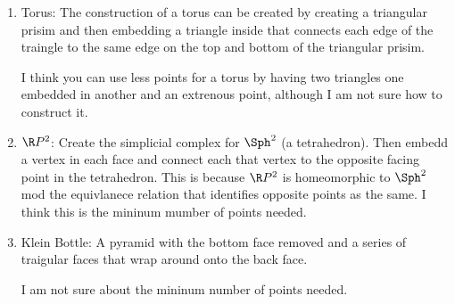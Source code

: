 \documentclass[12pt]{amsart}
\begin{document}
  \newpage
  \begin{problem}
  \begin{enumerate}
    \item Torus: The construction of a torus can be created by creating a triangular prisim and then embedding a triangle inside that connects each edge of the traingle to the same edge on the top and bottom of the triangular prisim.
    
    I think you can use less points for a torus by having two triangles one embedded in another and an extrenous point, although I am not sure how to construct it. 

    \item $\R P^2$: Create the simplicial complex for $\Sph^2$ (a tetrahedron). Then embedd a vertex in each face and connect each that vertex to the opposite facing point in the tetrahedron. This is because $\R P^2$ is homeomorphic to $\Sph^2$ mod the equivlanece relation that identifies opposite points as the same. I think this is the mininum mumber of points needed. 

    \item Klein Bottle: A pyramid  with the bottom face removed and a series of traigular faces that wrap around onto the back face. 

      I am not sure about the mininum number of points needed. 
  \end{enumerate} 
  \end{problem}
\end{document}
